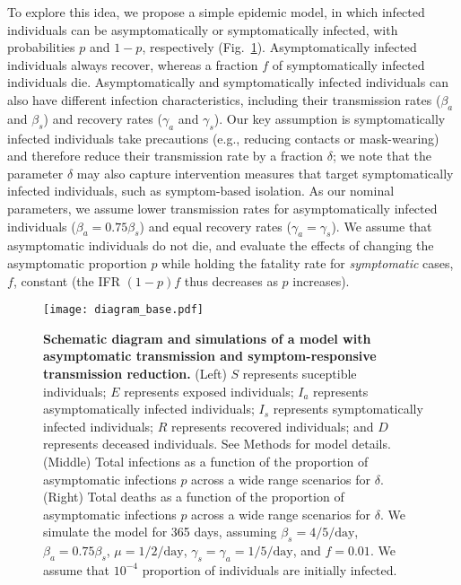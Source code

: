 \documentclass[12pt]{article}
\newcommand{\fref}[1]{Fig.~\ref{fig:#1}}
\begin{document}
To explore this idea, we propose a simple epidemic model,
in which infected individuals can be asymptomatically or symptomatically infected, with probabilities $p$ and $1-p$, respectively (\fref{base}).  
Asymptomatically infected individuals always recover, whereas a fraction $f$ of symptomatically infected individuals die.
Asymptomatically and symptomatically infected individuals can also have different infection characteristics, including their transmission rates ($\beta_a$ and $\beta_s$) and recovery rates ($\gamma_a$ and $\gamma_s$).
Our key assumption is symptomatically infected individuals take precautions (e.g., reducing contacts or mask-wearing) and therefore reduce their transmission rate by a fraction $\delta$;
we note that the parameter $\delta$ may also capture intervention measures that target symptomatically infected individuals, such as symptom-based isolation. 
As our nominal parameters, we assume lower transmission rates for asymptomatically infected individuals ($\beta_a = 0.75 \beta_s$) and equal recovery rates ($\gamma_a = \gamma_s$).
We assume that asymptomatic individuals do not die, and evaluate the effects of changing the asymptomatic proportion $p$ while holding the fatality rate for \emph{symptomatic} cases, $f$, constant (the IFR $(1-p)f$ thus decreases as $p$ increases).

\begin{figure}[!ht]
\texttt{[image: diagram\_base.pdf]}
\caption{
\textbf{Schematic diagram and simulations of a model with asymptomatic transmission and symptom-responsive transmission reduction.}
(Left) $S$ represents suceptible individuals; $E$ represents exposed individuals; $I_a$ represents asymptomatically infected individuals; $I_s$ represents symptomatically infected individuals; $R$ represents recovered individuals; and $D$ represents deceased individuals. See Methods for model details.
(Middle) Total infections as a function of the proportion of asymptomatic infections $p$ across a wide range scenarios for $\delta$.
(Right) Total deaths as a function of the proportion of asymptomatic infections $p$ across a wide range scenarios for $\delta$.
We simulate the model for 365 days, assuming $\beta_s = 4/5/\mathrm{day}$, $\beta_a = 0.75 \beta_s$, $\mu=1/2/\mathrm{day}$, $\gamma_s=\gamma_a=1/5/\mathrm{day}$, and $f=0.01$.
We assume that $10^{-4}$ proportion of individuals are initially infected.
}
\label{fig:base}
\end{figure}
\end{document}
